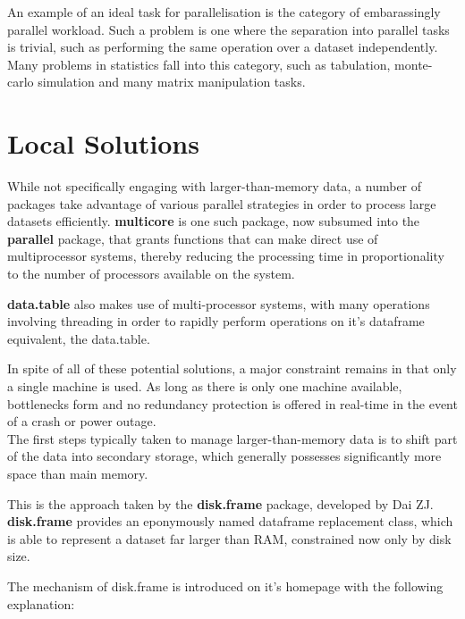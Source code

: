 \documentclass[a4paper,10pt]{article}
\begin{document}
An example of an ideal task for parallelisation is the category of embarassingly parallel workload.
Such a problem is one where the separation into parallel tasks is trivial, such as performing the same operation over a dataset independently\cite{foster1995parallel}.
Many problems in statistics fall into this category, such as tabulation, monte-carlo simulation and many matrix manipulation tasks.

\section{Local Solutions}
\label{local}

While not specifically engaging with larger-than-memory data, a number of packages take advantage of various parallel strategies in order to process large datasets efficiently.
\textbf{multicore} is one such package, now subsumed into the \textbf{parallel} package, that grants functions that can make direct use of multiprocessor systems, thereby reducing the processing time in proportionality to the number of processors available on the system.

\textbf{data.table} also makes use of multi-processor systems, with many operations involving threading in order to rapidly perform operations on it's dataframe equivalent, the data.table.

In spite of all of these potential solutions, a major constraint remains in that only a single machine is used.
As long as there is only one machine available, bottlenecks form and no redundancy protection is offered in real-time in the event of a crash or power outage.\\

The first steps typically taken to manage larger-than-memory data is to shift part of the data into secondary storage, which generally possesses significantly more space than main memory.

This is the approach taken by the \textbf{disk.frame} package, developed by Dai ZJ.
\textbf{disk.frame} provides an eponymously named dataframe replacement class, which is able to represent a dataset far larger than RAM, constrained now only by disk size\cite{zj20}.

The mechanism of disk.frame is introduced on it's homepage with the
following explanation:
\end{document}
